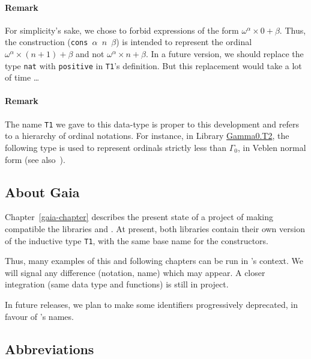 \paragraph{Remark}
For simplicity's sake, we chose to forbid  expressions of the form $\omega^\alpha\times 0 + \beta$. Thus, the construction (\texttt{cons $\alpha$ $n$ $\beta$}) is intended to represent the
ordinal $\omega^\alpha\times(n+1)+\beta$ and not $\omega^\alpha\times n+\beta$.
In a future version, we should replace  the type \texttt{nat} with \texttt{positive} in \texttt{T1}'s 
definition. But this replacement would take a lot of time \dots{}


\paragraph{Remark}
The name \texttt{T1} we gave to this data-type  is proper to this development and refers
to a hierarchy of ordinal notations. For instance, in Library \href{../theories/html/hydras.Gamma0.T2.html}{Gamma0.T2},  the following type is used to represent ordinals strictly less than \(\Gamma_0\),  in Veblen normal form (see also~\cite{Gaia, schutte}).
\noindent




\subsection{About Gaia}
\gaiasign Chapter~\vref{gaia-chapter} describes the present state of a
project of making compatible the libraries \HydrasLib and \gaia. At present, both libraries contain their own version of the inductive type \texttt{T1}, with the same base name for the constructors.


Thus, many examples of this and following chapters can be run
in \gaia's context. We will signal any difference (notation, name) which may appear.
A closer integration (same data type and functions) is still in project.

\begin{remark}
  \label{remark:hydra-gaia-renaming}
  \textcolor{lookcolor}{In future releases, we plan to make some
    \HydrasLib identifiers progressively  deprecated, in favour of \gaia's names.}
\end{remark}



\subsection{Abbreviations}

